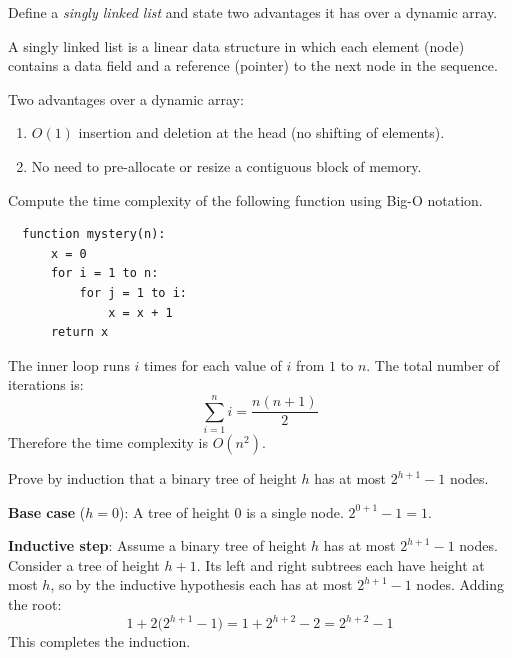 \documentclass[
    language=english,
    doctype=homework,
    institution=none,
]{../../omnilatex}
\begin{document}
\maketitle

\begin{exercise}[5]
Define a \emph{singly linked list} and state two advantages it has over a
dynamic array.
\end{exercise}
\begin{solution}
A singly linked list is a linear data structure in which each element (node)
contains a data field and a reference (pointer) to the next node in the
sequence.

Two advantages over a dynamic array:
\begin{enumerate}
    \item $O(1)$ insertion and deletion at the head (no shifting of elements).
    \item No need to pre-allocate or resize a contiguous block of memory.
\end{enumerate}
\end{solution}

\begin{exercise}[10]
Compute the time complexity of the following function using Big-O notation.
\begin{verbatim}
  function mystery(n):
      x = 0
      for i = 1 to n:
          for j = 1 to i:
              x = x + 1
      return x
\end{verbatim}
\end{exercise}
\begin{solution}
The inner loop runs $i$ times for each value of $i$ from $1$ to $n$.
The total number of iterations is:
\[
    \sum_{i=1}^{n} i = \frac{n(n+1)}{2}
\]
Therefore the time complexity is $O(n^{2})$.
\end{solution}

\begin{exercise}[15]
Prove by induction that a binary tree of height $h$ has at most $2^{h+1}-1$
nodes.
\end{exercise}
\begin{solution}
\textbf{Base case} ($h=0$): A tree of height $0$ is a single node.
$2^{0+1}-1 = 1$. \checkmark

\textbf{Inductive step}: Assume a binary tree of height $h$ has at most
$2^{h+1}-1$ nodes. Consider a tree of height $h+1$. Its left and right
subtrees each have height at most $h$, so by the inductive hypothesis each
has at most $2^{h+1}-1$ nodes. Adding the root:
\[
    1 + 2\bigl(2^{h+1}-1\bigr) = 1 + 2^{h+2}-2 = 2^{h+2}-1
\]
This completes the induction. \hfill\blacksquare
\end{solution}
\end{document}
